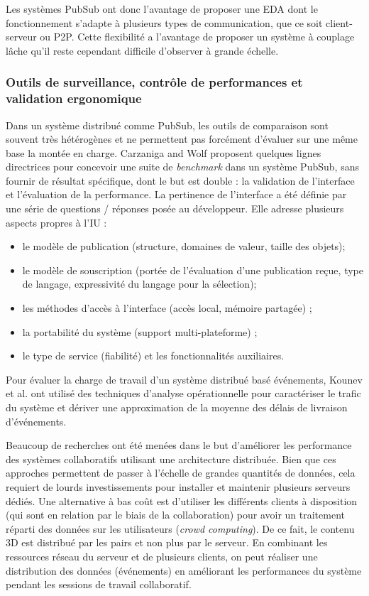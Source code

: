 Les systèmes \gls{PubSub} ont donc l'avantage de proposer une \gls{EDA} dont le 
fonctionnement s'adapte à plusieurs types de communication, que ce soit client-serveur
ou P2P. Cette flexibilité a l'avantage de proposer un système à couplage 
lâche qu'il reste cependant difficile d'observer à grande échelle.

\subsubsection{Outils de surveillance, contrôle de performances et validation ergonomique}
Dans un système distribué comme \gls{PubSub}, les outils de comparaison 
sont souvent très hétérogènes et ne permettent pas forcément d'évaluer sur une 
même base la montée en charge. 
Carzaniga and Wolf \cite{Carzaniga2002} proposent quelques 
lignes directrices pour concevoir une suite de \textit{benchmark} dans un système 
\gls{PubSub}, sans fournir de résultat spécifique, dont le but est double : la 
validation de l'interface et l'évaluation de la performance. 
La pertinence de l'interface a été définie par une série de questions / réponses 
posée au développeur. Elle adresse plusieurs aspects propres à l'\gls{IU} : 
\begin{itemize}
	\item le modèle de publication (structure, domaines de valeur, taille des objets);
	\item le modèle de souscription (portée de l'évaluation d'une publication reçue, 
	type de langage, expressivité du langage pour la sélection);
	\item les méthodes d'accès à l'interface (accès local, mémoire partagée) ; 
	\item la portabilité du système (support multi-plateforme) ;
	\item le type de service (fiabilité) et les fonctionnalités auxiliaires. 
\end{itemize}

Pour évaluer la charge de travail d'un système distribué basé événements, 
Kounev et al. \cite{Kounev2008} ont utilisé des techniques d'analyse 
opérationnelle pour caractériser le trafic du système et dériver une approximation 
de la moyenne des délais de livraison d'événements. 

Beaucoup de recherches ont été menées dans le but d'améliorer les performance 
des systèmes collaboratifs utilisant une architecture distribuée. Bien que ces 
approches permettent de passer à l'échelle de grandes quantités de données, cela 
requiert de lourds investissements pour installer et maintenir plusieurs serveurs 
dédiés. Une alternative à bas coût est d'utiliser les différents clients à disposition 
(qui sont en relation par le biais de la collaboration) pour avoir un traitement réparti 
des données sur les utilisateurs (\textit{crowd computing})\cite{Li2015}. De ce fait, le 
contenu \gls{3D} est distribué par les pairs et non plus par le serveur. En 
combinant les 
ressources réseau du serveur et de plusieurs clients, on peut réaliser une 
distribution des données (événements) en améliorant les performances du 
système pendant les sessions de travail collaboratif. 




